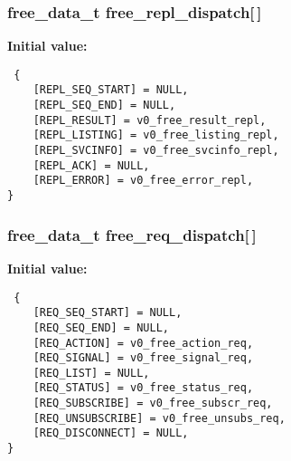 \subsubsection{\setlength{\rightskip}{0pt plus 5cm}\bf{free\_\-data\_\-t} \bf{free\_\-repl\_\-dispatch}[$\,$]\hspace{0.3cm}{\tt  [static]}}\label{upk__v0__protocol_8c_9a7d29b2c60459132d3fc7c646aa0b49}


\textbf{Initial value:}

\begin{Code}\begin{verbatim} {
    [REPL_SEQ_START] = NULL,
    [REPL_SEQ_END] = NULL,
    [REPL_RESULT] = v0_free_result_repl,
    [REPL_LISTING] = v0_free_listing_repl,
    [REPL_SVCINFO] = v0_free_svcinfo_repl,
    [REPL_ACK] = NULL,
    [REPL_ERROR] = v0_free_error_repl,
}
\end{verbatim}\end{Code}
\subsubsection{\setlength{\rightskip}{0pt plus 5cm}\bf{free\_\-data\_\-t} \bf{free\_\-req\_\-dispatch}[$\,$]\hspace{0.3cm}{\tt  [static]}}\label{upk__v0__protocol_8c_4984c51d45b00806aac2f64ef9acb2c6}


\textbf{Initial value:}

\begin{Code}\begin{verbatim} {
    [REQ_SEQ_START] = NULL,
    [REQ_SEQ_END] = NULL,
    [REQ_ACTION] = v0_free_action_req,
    [REQ_SIGNAL] = v0_free_signal_req,
    [REQ_LIST] = NULL,
    [REQ_STATUS] = v0_free_status_req,
    [REQ_SUBSCRIBE] = v0_free_subscr_req,
    [REQ_UNSUBSCRIBE] = v0_free_unsubs_req,
    [REQ_DISCONNECT] = NULL,
}
\end{verbatim}\end{Code}
